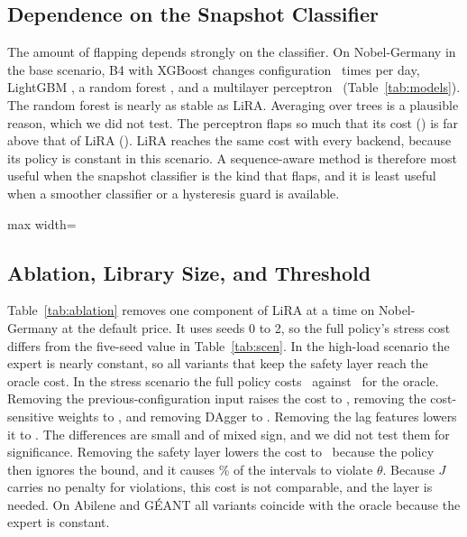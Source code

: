 \documentclass[preprint,12pt]{elsarticle}
\begin{document}
\subsection{Dependence on the Snapshot Classifier}\label{sec:res-models}

The amount of flapping depends strongly on the classifier. On Nobel-Germany in the base scenario, B4 with XGBoost changes configuration \modXgbChg\ times per day, LightGBM \modLgbmChg, a random forest \modRfChg, and a multilayer perceptron \modMlpChg\ (Table~\ref{tab:models}). The random forest is nearly as stable as LiRA. Averaging over trees is a plausible reason, which we did not test. The perceptron flaps so much that its cost (\modMlpJ) is far above that of LiRA (\nobJlira). LiRA reaches the same cost with every backend, because its policy is constant in this scenario. A sequence-aware method is therefore most useful when the snapshot classifier is the kind that flaps, and it is least useful when a smoother classifier or a hysteresis guard is available.

\begin{table}[t]
\centering
\caption{Choice of Model on Nobel-Germany (Base Scenario, Seed 0). Chg/d: Changes per Day}
\label{tab:models}
\footnotesize
\setlength{\tabcolsep}{3pt}
\begin{adjustbox}{max width=\textwidth}\end{adjustbox}
\end{table}

\subsection{Ablation, Library Size, and Threshold}\label{sec:res-ablation}

Table~\ref{tab:ablation} removes one component of LiRA at a time on Nobel-Germany at the default price. It uses seeds 0 to 2, so the full policy's stress cost differs from the five-seed value in Table~\ref{tab:scen}. In the high-load scenario the expert is nearly constant, so all variants that keep the safety layer reach the oracle cost. In the stress scenario the full policy costs \ablStressFull\ against \ablStressO\ for the oracle. Removing the previous-configuration input raises the cost to \ablStressNoPrev, removing the cost-sensitive weights to \ablStressNoCS, and removing DAgger to \ablStressNoDagger. Removing the lag features lowers it to \ablStressNoLag. The differences are small and of mixed sign, and we did not test them for significance. Removing the safety layer lowers the cost to \ablStressNoSafe\ because the policy then ignores the bound, and it causes \ablStressNoSafeViol\% of the intervals to violate $\theta$. Because $J$ carries no penalty for violations, this cost is not comparable, and the layer is needed. On Abilene and G\'{E}ANT all variants coincide with the oracle because the expert is constant.
\end{document}
